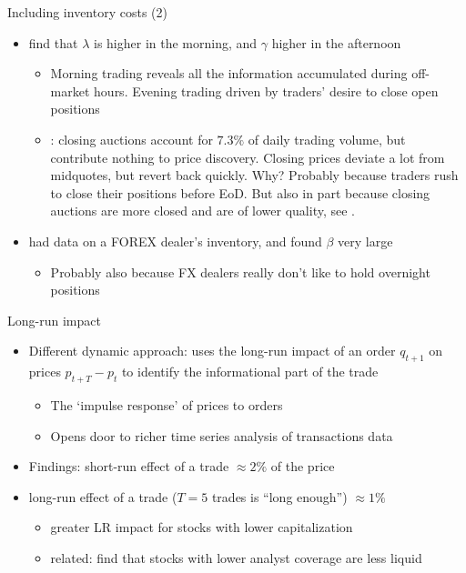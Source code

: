 \documentclass[english,10pt
,aspectratio=169
]{beamer}
\begin{document}
\begin{frame}{Including inventory costs (2)}
	\begin{itemize}
		\item \textbf{\citet*{madhavan_why_1997}} find that $\lambda$ is higher in the morning, and $\gamma$ higher in the afternoon
		\begin{itemize}
			\item Morning trading reveals all the information accumulated during off-market hours. Evening trading driven by traders' desire to close open positions
			\item \textbf{\cite{bogousslavsky_should_2020}}: closing auctions account for $7.3\%$ of daily trading volume, but contribute nothing to price discovery. Closing prices deviate a lot from midquotes, but revert back quickly. Why? 
			\pause 
			Probably because traders rush to close their positions before EoD. But also in part because closing auctions are more closed and are of lower quality, see \textbf{\cite{hu_vestigial_2020}}.
		\end{itemize}
		\item \textbf{\cite{lyons_tests_1995}} had data on a FOREX dealer's inventory, and found $\beta$ very large
		\begin{itemize}
			\item Probably also because FX dealers really don't like to hold overnight positions
		\end{itemize}
	\end{itemize}
\end{frame}


\begin{frame}{Long-run impact}
	\begin{itemize}
		\item Different dynamic approach: \textbf{\cite{hasbrouck_measuring_1991}} uses the long-run impact of an order $q_{t+1}$ on prices $p_{t+T}-p_t$ to identify the informational part of the trade
		\begin{itemize}
			\item The `impulse response' of prices to orders
			\item Opens door to richer time series analysis of transactions data
		\end{itemize}
		\item Findings: short-run effect of a trade $\approx 2\%$ of the price
		\item long-run effect of a trade ($T=5$ trades is ``long enough'') $\approx 1\%$
		\begin{itemize}
			\item greater LR impact for stocks with lower capitalization
			\item related: \textbf{\cite{ellul_financial_2018}} find that stocks with lower analyst coverage are less liquid
		\end{itemize}
	\end{itemize}
\end{frame}
\end{document}
